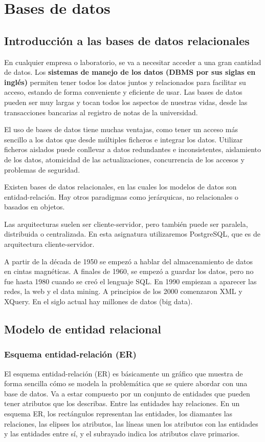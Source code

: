 \chapter{Bases de datos}
\section{Introducción a las bases de datos relacionales}
En cualquier empresa o laboratorio, se va a necesitar acceder a una gran cantidad de datos. Los \textbf{sistemas de manejo de los datos (DBMS por sus siglas en inglés)} permiten tener todos los datos juntos y relacionados para facilitar su acceso, estando de forma conveniente y eficiente de usar. Las bases de datos pueden ser muy largas y tocan todos los aspectos de nuestras vidas, desde las transacciones bancarias al registro de notas de la universidad. 

El uso de bases de datos tiene muchas ventajas, como tener un acceso más sencillo a los datos que desde múltiples ficheros e integrar los datos. Utilizar ficheros aislados puede conllevar a datos redundantes e inconsistentes, aislamiento de los datos, atomicidad de las actualizaciones, concurrencia de los accesos y problemas de seguridad.

Existen bases de datos relacionales, en las cuales los modelos de datos son entidad-relación. Hay otros paradigmas como jerárquicas, no relacionales o basados en objetos.

Las arquitecturas suelen ser cliente-servidor, pero también puede ser paralela, distribuida o centralizada. En esta asignatura utilizaremos PostgreSQL, que es de arquitectura cliente-servidor.

A partir de la década de 1950 se empezó a hablar del almacenamiento de datos en cintas magnéticas. A finales de 1960, se empezó a guardar los datos, pero no fue hasta 1980 cuando se creó el lenguaje SQL. En 1990 empiezan a aparecer las redes, la web y el data mining. A principios de los 2000 comenzaron XML y XQuery. En el siglo actual hay millones de datos (big data).

\section{Modelo de entidad relacional}
\subsection{Esquema entidad-relación (ER)}
El esquema entidad-relación (ER) es básicamente un gráfico que muestra de forma sencilla cómo se modela la problemática que se quiere abordar con una base de datos. Va a estar compuesto por un conjunto de entidades que pueden tener atributos que los describas. Entre las entidades hay relaciones. En un esquema ER, los rectángulos representan las entidades, los diamantes las relaciones, las elipses los atributos, las líneas unen los atributos con las entidades y las entidades entre sí, y el subrayado indica los atributos clave primarios. 

